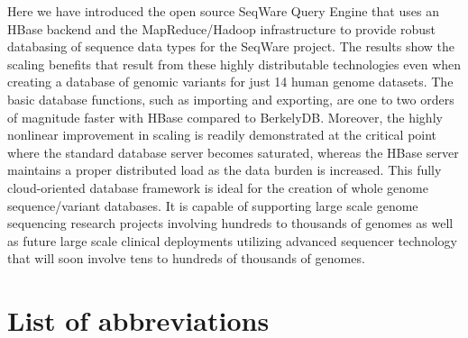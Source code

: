 \documentclass[10pt]{bmc_article}
\newenvironment{bmcformat}{\begin{raggedright}\baselineskip20pt\sloppy\setboolean{publ}{false}}{\end{raggedright}\baselineskip20pt\sloppy}
\begin{document}
\begin{bmcformat}
Here we have introduced the open source SeqWare Query Engine that uses an HBase backend and the MapReduce/Hadoop infrastructure to provide robust databasing of sequence data types for the SeqWare project. The results show the scaling benefits that result from these highly distributable technologies even when creating a database of genomic variants for just 14 human genome datasets. The basic database functions, such as importing and exporting, are one to two orders of magnitude faster with HBase compared to BerkelyDB. Moreover, the highly nonlinear improvement in scaling is readily demonstrated at the critical point where the standard database server becomes saturated, whereas the HBase server maintains a proper distributed load as the data burden is increased. This fully cloud-oriented database framework is ideal for the creation of whole genome sequence/variant databases. It is capable of supporting large scale genome sequencing research projects involving hundreds to thousands of genomes  as well as future large scale clinical deployments utilizing advanced sequencer technology that will soon involve tens to hundreds of thousands of genomes.  

\section*{List of abbreviations}


\end{bmcformat}
\end{document}
